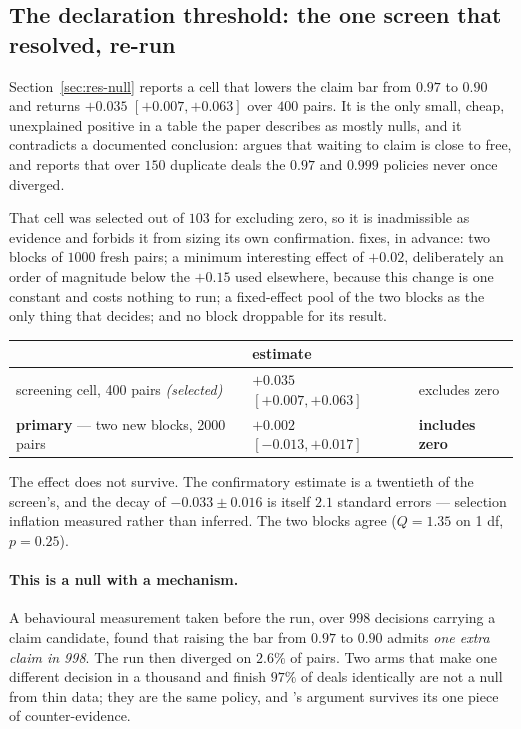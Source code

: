 \documentclass[11pt,a4paper]{article}
\begin{document}
\subsection{The declaration threshold: the one screen that resolved, re-run}
\label{sec:res-claimthreshold}

Section~\ref{sec:res-null} reports a cell that lowers the claim bar from $0.97$
to $0.90$ and returns $+0.035$ $[+0.007, +0.063]$ over $400$ pairs. It is the
only small, cheap, unexplained positive in a table the paper describes as mostly
nulls, and it contradicts a documented conclusion: 
argues that waiting to claim is close to free, and reports that over $150$
duplicate deals the $0.97$ and $0.999$ policies never once diverged.

That cell was selected out of $103$ for excluding zero, so it is inadmissible as
evidence and  forbids it from sizing its
own confirmation.  fixes, in
advance: two blocks of $1000$ fresh pairs; a minimum interesting effect of
$+0.02$, deliberately an order of magnitude below the $+0.15$ used elsewhere,
because this change is one constant and costs nothing to run; a fixed-effect
pool of the two blocks as the only thing that decides; and no block droppable
for its result.

\begin{center}
\small
\begin{tabular}{lll}
\toprule
& estimate & \\
\midrule
screening cell, 400 pairs \emph{(selected)} & $+0.035$ $[+0.007, +0.063]$ & excludes zero \\
\textbf{primary} --- two new blocks, 2000 pairs & $\mathbf{+0.002}$ $[-0.013, +0.017]$ & \textbf{includes zero} \\
\bottomrule
\end{tabular}
\end{center}

The effect does not survive. The confirmatory estimate is a twentieth of the
screen's, and the decay of $-0.033 \pm 0.016$ is itself $2.1$ standard errors
--- selection inflation measured rather than inferred. The two blocks agree
($Q = 1.35$ on 1 df, $p = 0.25$).

\paragraph{This is a null with a mechanism.} A behavioural measurement taken
before the run, over $998$ decisions carrying a claim candidate, found that
raising the bar from $0.97$ to $0.90$ admits \emph{one extra claim in 998}. The
run then diverged on $2.6\%$ of pairs. Two arms that make one different decision
in a thousand and finish $97\%$ of deals identically are not a null from thin
data; they are the same policy, and 's argument survives its
one piece of counter-evidence.
\end{document}
